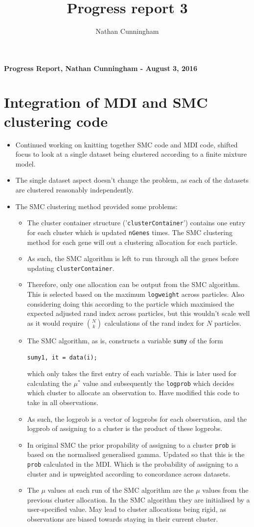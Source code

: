 \documentclass[10pt,a4paper]{report}
\author{Nathan Cunningham}
\title{Progress report 3}
\begin{document}
\textbf{Progress Report, Nathan Cunningham - August 3, 2016}

\section*{Integration of MDI and SMC clustering code}
\begin{itemize}
\item Continued working on knitting together SMC code and MDI code, shifted focus to look at a single dataset being clustered according to a finite mixture model.
\item The single dataset aspect doesn't change the problem, as each of the datasets are clustered reasonably independently.

\item The SMC clustering method provided some problems:
\begin{itemize}
\item The cluster container structure ('\texttt{clusterContainer}') contains one entry for each cluster which is updated \texttt{nGenes} times. The SMC clustering method for each gene will out a clustering allocation for each particle. 
\item As such, the SMC algorithm is left to run through all the genes before updating \texttt{clusterContainer}.
\item Therefore, only one allocation can be output from the SMC algorithm. This is selected based on the maximum \texttt{logweight} across particles. Also considering doing this according to the particle which maximised the expected adjusted rand index across particles, but this wouldn't scale well as it would require ${N \choose k}$ calculations of the rand index for $N$ particles.
\item The SMC algorithm, as is, constructs a variable \texttt{sumy} of the form
\begin{center}
\texttt{sumy{1, it} = data(i);}
\end{center}
which only takes the first entry of each variable. This is later used for calculating the $\mu^*$ value and subsequently the \texttt{logprob} which decides which cluster to allocate an observation to. Have modified this code to take in all observations.
\item As such, the logprob is a vector of logprobs for each observation, and the logprob of assigning to a cluster is the product of these logprobs.
\item In original SMC the prior propability of assigning to a cluster \texttt{prob} is based on the normalised generalised gamma. Updated so that this is the \texttt{prob} calculated in the MDI.  Which is the probability of assigning to a cluster and is upweighted according to concordance across datasets.
\item The $\mu$ values at each run of the SMC algorithm are the $\mu$ values from the previous cluster allocation. In the SMC algorithm they are initialised by a user-specified value. May lead to cluster allocations being rigid, as observations are biased towards staying in their current cluster.


\end{itemize}
\end{itemize}
\end{document}

